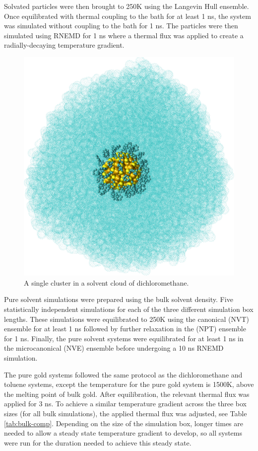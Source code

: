 Solvated particles were then brought to 250K using the Langevin Hull ensemble.\cite{Vardeman2011} 
Once equilibrated with thermal coupling to the bath for at least 1 ns, the system was simulated without coupling to the bath for 1 ns. 
The particles were then simulated using RNEMD for 1 ns where a thermal flux was applied to create a radially-decaying temperature gradient. 
\begin{figure}
    \centering
    \includegraphics[scale=0.4]{figures/dcm-part.pdf}
    \caption{ A single  cluster in a solvent cloud of dichloromethane.}
    \label{fig:lambda-bulk}
\end{figure}

Pure solvent simulations were prepared using the bulk solvent density. 
Five statistically independent simulations for each of the three different simulation box lengths.
These simulations were equilibrated to 250K using the canonical (NVT) ensemble for at least 1 ns followed by further relaxation in the (NPT) ensemble for 1 ns.
Finally, the pure solvent systems were equilibrated for at least 1 ns in the microcanonical (NVE) ensemble before undergoing a 10 ns RNEMD simulation.

The pure gold systems followed the same protocol as the dichloromethane and toluene systems, except the temperature for the pure gold system is 1500K, above the melting point of bulk gold.
After equilibration, the relevant thermal flux was applied for 3 ns.
To achieve a similar temperature gradient across the three box sizes (for all bulk simulations), the applied thermal flux was adjusted, see Table \ref{tab:bulk-comp}.
Depending on the size of the simulation box, longer times are needed to allow a steady state temperature gradient to develop, so all systems were run for the duration needed to achieve this steady state.

